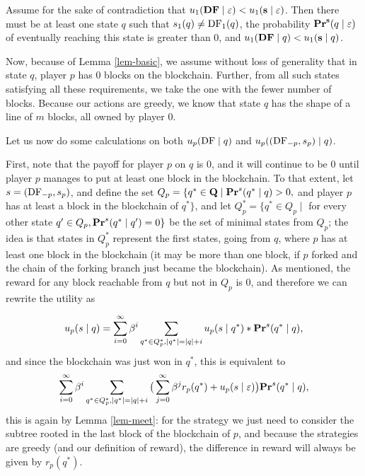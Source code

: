 Assume for the sake of contradiction that $u_1(\text{\rm {\bf DF}} \mid \varepsilon) < u_1( \mathbf{s} \mid \varepsilon)$. Then there must be at least one 
state $q$ such that $s_1(q) \neq \text{\rm DF}_1(q)$, the probability $\mathbf{Pr}^{\mathbf{s}}(q \mid \varepsilon)$ of eventually reaching this state is greater than $0$, and $u_1(\text{\rm {\bf DF}} \mid q) < u_1(\mathbf{s} \mid q)$. 







Now, because of Lemma \ref{lem-basic}, we assume without loss of generality that in state $q$, player $p$ has $0$ blocks on the blockchain. Further, from all such states satisfying all these requirements, we take the one with the fewer number of blocks. Because our actions are greedy, we know that state $q$ has the shape of a line of $m$ blocks, all owned by player $0$. 

Let us now do some calculations on both $u_p(\text{\rm DF} \mid q)$ and $u_p( (\text{\rm DF}_{-p},s_p) \mid q)$. 
\medskip

First, note that the payoff for player $p$ on $q$ is $0$, and it will continue to be $0$ until player $p$ manages to put at least one block in the blockchain. To that extent, let $s = (\text{\rm DF}_{-p},s_p)$, and define the set 
$Q_p = \{q^* \in \mathbf{Q} \mid \mathbf{Pr}^s(q^* \mid q) > 0, $ and player $p$ has at least a block in the blockchain of $q^* \}$, 
and let $Q^*_p=\{q^* \in Q_p \mid$ for every other state $q' \in Q_p, \mathbf{Pr}^s(q^* \mid q')=0 \}$ be the set of minimal states from $Q_p$; 
the idea is that states in $Q^*_p$ represent the first states, going from $q$, where $p$ has at least one block in the blockchain 
(it may be more than one block, if $p$ forked and the chain of the forking branch just became the blockchain). 
As mentioned, the reward for any block reachable from $q$ but not in $Q_p$ is $0$, and therefore we can rewrite the utility as

$$u_p( s \mid q) = \sum_{i=0}^\infty \beta^i \sum_{q^* \in Q^*_p, |q^*| = |q| + i} u_p(s \mid q^*) * \mathbf{Pr}^s(q^* \mid q), $$
and since the blockchain was just won in $q^*$, %
this is equivalent to 
$$ \sum_{i=0}^\infty \beta^i \sum_{q^* \in Q^*_p, |q^*| = |q| + i} \big(\sum_{j = 0}^\infty \beta^j r_p(q^*) + u_p(s \mid \varepsilon) \big) \mathbf{Pr}^s(q^* \mid q), $$
this is again by Lemma \ref{lem-meet}: for the strategy we just need to consider the subtree rooted in the last block of the blockchain of $p$, and 
because the strategies are greedy (and our definition of reward), the difference in reward will always be given by $r_p(q^*)$. 

